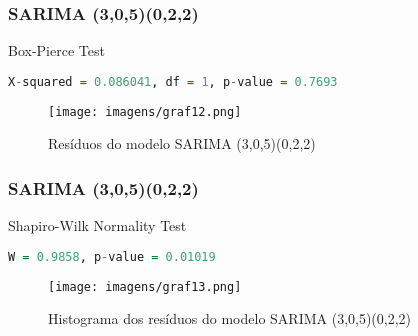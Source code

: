 \documentclass{beamer}
\begin{document}

\begin{frame}[fragile] 
 \frametitle{SARIMA (3,0,5)(0,2,2)}

Box-Pierce Test

\begin{lstlisting}[language=R]
X-squared = 0.086041, df = 1, p-value = 0.7693
\end{lstlisting}

  \begin{figure}
     \centering
     \texttt{[image: imagens/graf12.png]}
     \caption{Resíduos do modelo SARIMA (3,0,5)(0,2,2)}
     \label{fig:enter-label}
  \end{figure}
\end{frame}


\begin{frame}[fragile] 
 \frametitle{SARIMA (3,0,5)(0,2,2)}

Shapiro-Wilk Normality Test

\begin{lstlisting}[language=R]
W = 0.9858, p-value = 0.01019
\end{lstlisting}

  \begin{figure}
     \centering
     \texttt{[image: imagens/graf13.png]}
     \caption{Histograma dos resíduos do modelo SARIMA (3,0,5)(0,2,2)}
     \label{fig:enter-label}
  \end{figure}
\end{frame}





 
\end{document}
